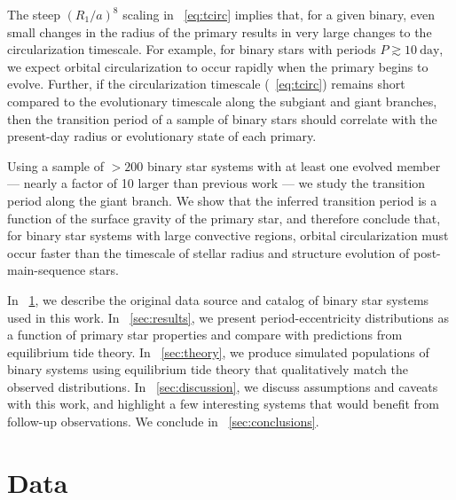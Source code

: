 \documentclass[modern, letterpaper]{aastex62}
\begin{document}
The steep $\left(R_1 / a\right)^8$ scaling in \eqname~\ref{eq:tcirc}
implies that, for a given binary, even small changes in the radius of the
primary results in very large changes to the circularization timescale.
For example, for binary stars with periods $P \gtrsim 10~\textrm{day}$, we
expect orbital circularization to occur rapidly when the primary begins to
evolve.
Further, if the circularization timescale (\eqname~\ref{eq:tcirc}) remains short
compared to the evolutionary timescale along the subgiant and giant branches,
then the transition period of a sample of binary stars should
correlate with the present-day radius or evolutionary state of each primary.

Using a sample of $>200$ binary star systems with at least one evolved member --- nearly a factor of 10 larger than previous work \citep{Verbunt:1995} --- we study the transition period along the giant branch.
We show that the inferred transition period is a function of the surface gravity of the primary star, and therefore conclude that, for binary star systems with large convective regions, orbital circularization must occur faster than the timescale of stellar radius and structure evolution of post-main-sequence stars.

In \sectionname~\ref{sec:data}, we describe the original data source and catalog of binary star systems used in this work.
In \sectionname~\ref{sec:results}, we present period-eccentricity distributions as a function of primary star properties and compare with predictions from equilibrium tide theory.
In \sectionname~\ref{sec:theory}, we produce simulated populations of binary systems using equilibrium tide theory that qualitatively match the observed distributions.
In \sectionname~\ref{sec:discussion}, we discuss assumptions and caveats with this work, and highlight a few interesting systems that would benefit from follow-up observations.
We conclude in \sectionname~\ref{sec:conclusions}.


\section{Data} \label{sec:data}
\end{document}
